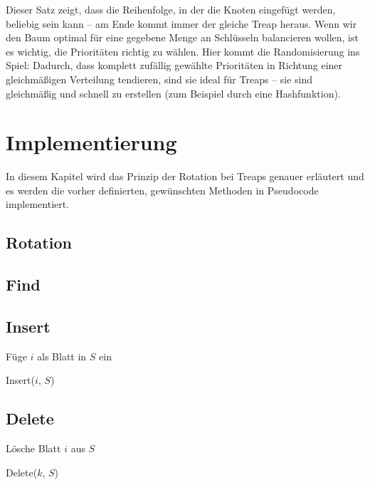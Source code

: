 \documentclass[a4paper]{scrreprt}
\theoremstyle{definition}
\begin{document}
Dieser Satz zeigt, dass die Reihenfolge, in der die Knoten eingefügt werden, beliebig sein kann -- am Ende kommt immer der gleiche Treap heraus. Wenn wir den Baum optimal für eine gegebene Menge an Schlüsseln balancieren wollen, ist es wichtig, die Prioritäten richtig zu wählen. Hier kommt die Randomisierung ins Spiel: Dadurch, dass komplett zufällig gewählte Prioritäten in Richtung einer gleichmäßigen Verteilung tendieren, sind sie ideal für Treaps -- sie sind gleichmäßig und schnell zu erstellen (zum Beispiel durch eine Hashfunktion).

\section{Implementierung}
\label{sec:implementing}

In diesem Kapitel wird das Prinzip der Rotation bei Treaps genauer erläutert und es werden die vorher definierten, gewünschten Methoden in Pseudocode implementiert.

\subsection{Rotation}
\label{sec:rotation}

\subsection{Find}
\label{sec:find}

\subsection{Insert}
\label{sec:insert}

\begin{algorithm}[H]
		Füge $i$ als Blatt in $S$ ein \;
	\caption{Insert($i$, $S$)}
\end{algorithm}

\subsection{Delete}
\label{sec:delete}

\begin{algorithm}[H]
		Lösche Blatt $i$ aus $S$ \;
	\caption{Delete($k$, $S$)}
\end{algorithm}
\end{document}
